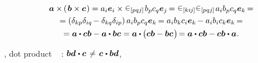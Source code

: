 \begin{otherlanguage}{russian}
\nopagebreak\vspace{-0.5em}\begin{multline}
\bm{a} \times \hspace{-0.15ex} \left(\hspace{.2ex}{\bm{b} \times \bm{c}}\hspace{.15ex}\right)
= a_i \bm{e}_i \times \permutationsparitysymbols{pqj} \hspace{.2ex} b_p c_q \bm{e}_j \hspace{-0.2ex}
= \permutationsparitysymbols{ki\hspace{-0.1ex}j} \permutationsparitysymbols{pqj} \hspace{.2ex} a_i b_p c_q \bm{e}_k \hspace{-0.2ex} =
\\
= \left({\delta_{kp}\delta_{iq} \hspace{-0.2ex} - \delta_{kq}\delta_{ip}}\right) a_i b_p c_q \bm{e}_k \hspace{-0.2ex}
= a_i b_k c_i \bm{e}_k \hspace{-0.15ex} - a_i b_i c_k \bm{e}_k \hspace{-0.2ex} =
\\
= \bm{a} \dotp \bm{c} \bm{b} - \bm{a} \dotp \bm{b} \bm{c}
= \bm{a} \dotp \hspace{-0.1ex} \bigl( \bm{c} \bm{b} - \bm{b} \bm{c} \hspace{.15ex} \bigr) \hspace{-0.3ex}
= \bm{a} \dotp \bm{c} \bm{b} - \bm{c} \bm{b} \dotp \bm{a}
\hspace{.1ex} .
\end{multline}

\end{otherlanguage}

\vspace{-0.1em}\noindent
{}, dot product  ~ :\ru{\hspace{.2ex}}
${\bm{b} \bm{d} \hspace{.1ex} \dotp \bm{c} \hspace{.25ex} \neq \hspace{.25ex} \bm{c} \hspace{.1ex} \dotp \bm{b} \bm{d}}$,
~ 

